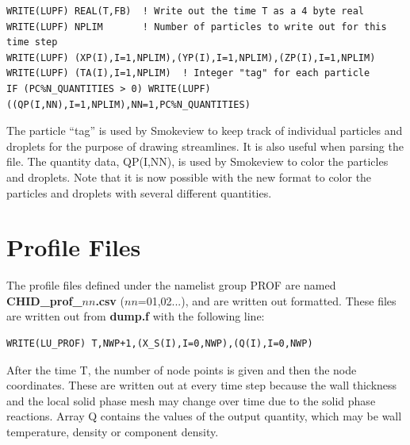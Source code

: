 \documentclass[11pt]{book}
\begin{document}
\footnotesize
\begin{verbatim}
WRITE(LUPF) REAL(T,FB)  ! Write out the time T as a 4 byte real
WRITE(LUPF) NPLIM       ! Number of particles to write out for this time step
WRITE(LUPF) (XP(I),I=1,NPLIM),(YP(I),I=1,NPLIM),(ZP(I),I=1,NPLIM)
WRITE(LUPF) (TA(I),I=1,NPLIM)  ! Integer "tag" for each particle
IF (PC%N_QUANTITIES > 0) WRITE(LUPF) ((QP(I,NN),I=1,NPLIM),NN=1,PC%N_QUANTITIES)
\end{verbatim}
\normalsize
The particle ``tag'' is used by Smokeview to keep track of individual particles and droplets for the purpose of drawing
streamlines. It is also useful when parsing the file. The quantity data, {\ct QP(I,NN)}, is used by Smokeview to color
the particles and droplets. Note that it is now possible with the new format to color the particles and droplets with
several different quantities.

\section{Profile Files}%
\label{out:PROF}

The profile files defined under the namelist group {\ct PROF} are
named {\bf CHID\_prof\_$nn$.csv} ($nn$=01,02...),
and are written out formatted. These files are written out from {\bf
dump.f} with the following line:

\footnotesize
\begin{verbatim}
WRITE(LU_PROF) T,NWP+1,(X_S(I),I=0,NWP),(Q(I),I=0,NWP)
\end{verbatim}
\normalsize
After the time {\ct T}, the number of node points is given and then
the node coordinates. These are written out at every time step because
the wall thickness and the local solid phase mesh may change over time
due to the solid phase reactions. Array {\ct Q} contains the values of
the output quantity, which may be wall temperature, density or
component density.








\printindex
\end{document}
